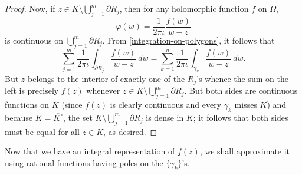 \documentclass[11pt]{article}
\theoremstyle{thmstyle}
\theoremstyle{defstyle}
\begin{document}
\begin{proof}
    Now, if $\displaystyle z\in K\setminus\bigcup_{j = 1}^m \partial R_j$, then for any holomorphic function $f$ on $\Omega$, 
    \begin{equation*}
        \varphi(w) = \frac{1}{2\pi\iota} \frac{f(w)}{w - z}
    \end{equation*}
    is continuous on $\displaystyle\bigcup_{j = 1}^m\partial R_j$. From \eqref{integration-on-polygons}, it follows that 
    \begin{equation*}
        \sum_{j = 1}^m\frac{1}{2\pi\iota}\int_{\partial R_j}\frac{f(w)}{w - z}~dw = \sum_{k = 1}^n\frac{1}{2\pi\iota}\int_{\gamma_k}\frac{f(w)}{w - z}~dw.
    \end{equation*}
    But $z$ belongs to the interior of exactly one of the $R_j$'s whence the sum on the left is precisely $f(z)$ whenever $\displaystyle z\in K\setminus\bigcup_{j = 1}^m\partial R_j$. But both sides are continuous functions on $K$ (since $f(z)$ is clearly continuous and every $\gamma_k$ misses $K$) and because $K = \overline{K^\circ}$, the set $K\setminus\bigcup_{j = 1}^m\partial R_j$ is dense in $K$; it follows that both sides must be equal for all $z\in K$, as desired.
\end{proof}

Now that we have an integral representation of $f(z)$, we shall approximate it using rational functions having poles on the $\{\gamma_k\}$'s.
\end{document}

